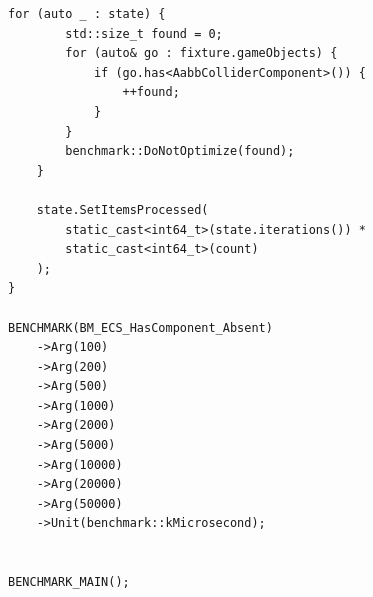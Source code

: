 \begin{lstlisting}[style=c++style,
basicstyle=\ttfamily\footnotesize,
    caption={Benchmark-Quellcode basierend auf der SoA-Implementierung der ECS-Infrastruktur in Meilenstein~5.},
    label=lst:soa_benchmark]
    for (auto _ : state) {
        std::size_t found = 0;
        for (auto& go : fixture.gameObjects) {
            if (go.has<AabbColliderComponent>()) {
                ++found;
            }
        }
        benchmark::DoNotOptimize(found);
    }

    state.SetItemsProcessed(
        static_cast<int64_t>(state.iterations()) *
        static_cast<int64_t>(count)
    );
}

BENCHMARK(BM_ECS_HasComponent_Absent)
    ->Arg(100)
    ->Arg(200)
    ->Arg(500)
    ->Arg(1000)
    ->Arg(2000)
    ->Arg(5000)
    ->Arg(10000)
    ->Arg(20000)
    ->Arg(50000)
    ->Unit(benchmark::kMicrosecond);


BENCHMARK_MAIN();

\end{lstlisting}